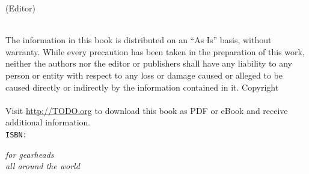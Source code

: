\thispagestyle{empty}
\booktitle
\newpage
\newpage
\begin{titlepage}
\begin{flushright}
\bookeditor{} (Editor)\\
\vspace{10em}
{\Huge\bfseries\sffamily\booktitle}\\
\vspace{2em}
{\large\sffamily\booksubtitle}
\end{flushright}
\end{titlepage}
\thispagestyle{empty}
The information in this book is distributed on an ``As Is'' basis, without warranty. While every precaution has been taken in the preparation of this work, neither the authors nor the editor or publishers shall have any liability to any person or entity with respect to any loss or damage caused or alleged to be caused directly or indirectly by the information contained in it.%
\vfill
Copyright \textcopyright{} \bookyear{} \bookauthors\\
\newline
{}
\newline \\
Visit \url{http://TODO.org} to download this book as PDF or eBook and receive additional information.
\newline \\
{\tt ISBN: \bookisbn}%
\newpage
\thispagestyle{empty}
\vspace*{2cm}
\begin{flushright}
{\Large\itshape for gearheads\\all around the world}\\
\end{flushright}
\newpage
\thispagestyle{empty}
\mbox{}
\newpage
